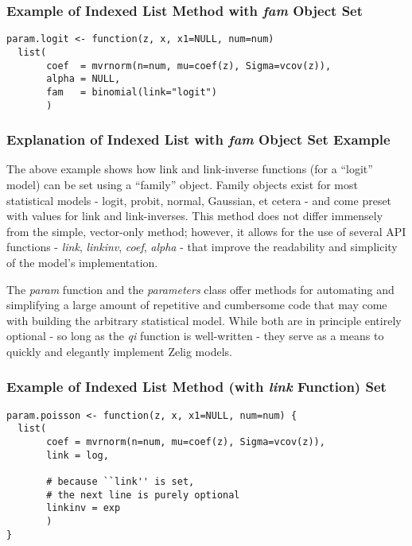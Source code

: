 \documentclass[a4paper,11pt]{article}
\begin{document}
\subsubsection{Example of Indexed List Method with \emph{fam} Object Set}

\begin{verbatim}
param.logit <- function(z, x, x1=NULL, num=num)
  list(
       coef  = mvrnorm(n=num, mu=coef(z), Sigma=vcov(z)),
       alpha = NULL,
       fam   = binomial(link="logit")
       )
\end{verbatim}


\subsubsection{Explanation of Indexed List with \emph{fam} Object Set Example}

The above example shows how link and link-inverse functions (for a ``logit'' model) can be set using a ``family'' object.  Family objects exist for most statistical models - logit, probit, normal, Gaussian, et cetera - and come preset with values for link and link-inverses.  This method does not differ immensely from the simple, vector-only method; however, it allows for the use of several API functions - \emph{link}, \emph{linkinv}, \emph{coef}, \emph{alpha} - that improve the readability and simplicity of the model's implementation.

The \emph{param} function and the \emph{parameters} class offer methods for automating and simplifying a large amount of repetitive and cumbersome code that may come with building the arbitrary statistical model.  While both are in principle entirely optional - so long as the \emph{qi} function is well-written - they serve as a means to quickly and elegantly implement Zelig models.


\subsubsection{Example of Indexed List Method (with \emph{link} Function) Set}

\begin{verbatim}
param.poisson <- function(z, x, x1=NULL, num=num) {
  list(
       coef = mvrnorm(n=num, mu=coef(z), Sigma=vcov(z)),
       link = log,
             
       # because ``link'' is set,
       # the next line is purely optional
       linkinv = exp
       )
}
\end{verbatim}
\end{document}
